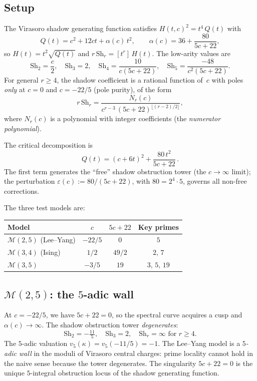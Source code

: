\documentclass[11pt]{article}
\newcommand{\cM}{\mathcal{M}}
\begin{document}
\subsection*{Setup}

The Virasoro shadow generating function satisfies
$H(t,c)^2 = t^4\,Q(t)$ with
\[
Q(t) = c^2 + 12ct + \alpha(c)\,t^2,
\qquad
\alpha(c) = 36 + \frac{80}{5c+22},
\]
so $H(t) = t^2\sqrt{Q(t)}$ and
$r\,\mathrm{Sh}_r = [t^r]\,H(t)$.  The low-arity values are
\[
\mathrm{Sh}_2 = \frac{c}{2},
\quad
\mathrm{Sh}_3 = 2,
\quad
\mathrm{Sh}_4 = \frac{10}{c(5c{+}22)},
\quad
\mathrm{Sh}_5 = \frac{-48}{c^2(5c{+}22)}.
\]
For general $r \ge 4$, the shadow coefficient is a rational
function of~$c$ with poles \emph{only} at $c = 0$ and
$c = -22/5$ (pole purity), of the form
\[
r\,\mathrm{Sh}_r
= \frac{N_r(c)}{c^{r-3}\,(5c{+}22)^{\lfloor(r{-}2)/2\rfloor}},
\]
where $N_r(c)$ is a polynomial with integer coefficients
(the \emph{numerator polynomial}).

The critical decomposition is
\[
Q(t) = (c + 6t)^2 + \frac{80\,t^2}{5c + 22}\,.
\]
The first term generates the ``free'' shadow obstruction tower
(the $c \to \infty$ limit); the perturbation
$\varepsilon(c) := 80/(5c + 22)$, with
$80 = 2^4 \cdot 5$, governs all non-free corrections.

\smallskip

The three test models are:
\begin{center}
\renewcommand{\arraystretch}{1.3}
\begin{tabular}{lccc}
\hline
Model & $c$ & $5c+22$ & Key primes \\
\hline
$\cM(2,5)$ (Lee--Yang) & $-22/5$ & $0$ & $5$ \\
$\cM(3,4)$ (Ising) & $1/2$ & $49/2$ & $2,\,7$ \\
$\cM(3,5)$ & $-3/5$ & $19$ & $3,\,5,\,19$ \\
\hline
\end{tabular}
\end{center}

\subsection*{$\cM(2,5)$: the $5$-adic wall}

At $c = -22/5$, we have $5c + 22 = 0$, so the spectral curve
acquires a cusp and $\alpha(c) \to \infty$.  The shadow obstruction tower
\emph{degenerates}:
\[
\mathrm{Sh}_2 = -\tfrac{11}{5}, \quad
\mathrm{Sh}_3 = 2, \quad
\mathrm{Sh}_r = \infty \text{ for } r \ge 4.
\]
The $5$-adic valuation $v_5(\kappa) = v_5(-11/5) = -1$.  The
Lee--Yang model is a \emph{$5$-adic wall} in the moduli of
Virasoro central charges: prime locality cannot hold in the
naive sense because the tower degenerates.  The singularity
$5c + 22 = 0$ is the unique $5$-integral obstruction locus of
the shadow generating function.
\end{document}

